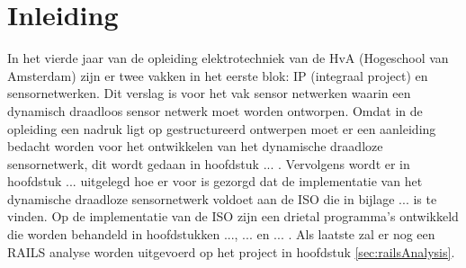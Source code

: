 \section{Inleiding}

In het vierde jaar van de opleiding elektrotechniek van de HvA (Hogeschool van Amsterdam) zijn er twee vakken in het eerste blok: IP (integraal project) en sensornetwerken. Dit verslag is voor het vak sensor netwerken waarin een dynamisch draadloos sensor netwerk moet worden ontworpen. Omdat in de opleiding een nadruk ligt op gestructureerd ontwerpen moet er een aanleiding bedacht worden voor het ontwikkelen van het dynamische draadloze sensornetwerk, dit wordt gedaan in hoofdstuk ... . Vervolgens wordt er in hoofdstuk ... uitgelegd hoe er voor is gezorgd dat de implementatie van het dynamische draadloze sensornetwerk voldoet aan de ISO die in bijlage ...  is te vinden. Op de implementatie van de ISO zijn een drietal programma's ontwikkeld die worden behandeld in hoofdstukken ..., ... en ... . Als laatste zal er nog een RAILS analyse worden uitgevoerd op het project in hoofdstuk \ref{sec:railsAnalysis}.